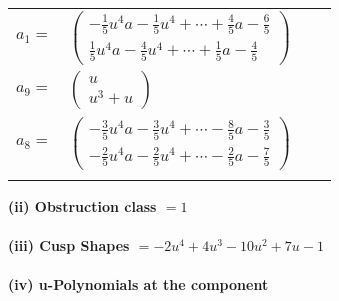 \documentclass[1p]{elsarticle_modified}
\theoremstyle{definition}
\begin{document}
\begin{tabular}{m{7pt} m{180pt} m{7pt} m{180pt} }
\flushright $a_{1}=$&$\begin{pmatrix}-\frac{1}{5} u^4 a-\frac{1}{5} u^4+\cdots+\frac{4}{5} a-\frac{6}{5}\\\frac{1}{5} u^4 a-\frac{4}{5} u^4+\cdots+\frac{1}{5} a-\frac{4}{5}\end{pmatrix}$ \\
\flushright $a_{9}=$&$\begin{pmatrix}u\\u^3+u\end{pmatrix}$ \\
\flushright $a_{8}=$&$\begin{pmatrix}-\frac{3}{5} u^4 a-\frac{3}{5} u^4+\cdots-\frac{8}{5} a-\frac{3}{5}\\-\frac{2}{5} u^4 a-\frac{2}{5} u^4+\cdots-\frac{2}{5} a-\frac{7}{5}\end{pmatrix}$\\&\end{tabular}
\flushleft \textbf{(ii) Obstruction class $= 1$}\\~\\
\flushleft \textbf{(iii) Cusp Shapes $= -2 u^4+4 u^3-10 u^2+7 u-1$}\\~\\
\newpage\renewcommand{\arraystretch}{1}
\flushleft \textbf{(iv) u-Polynomials at the component}\newline \\
\end{document}
